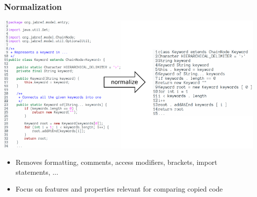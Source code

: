 \subsubsection{Normalization}
\begin{frame}{\insertsubsection}{\insertsubsubsection}
	\begin{center}
		\includegraphics[width=0.9\linewidth]{fig/normalization_1.pdf}
	\end{center}
	\begin{itemize}
		\small
		\item Removes formatting, comments, access modifiers, brackets, import statements, ...
		\item Focus on features and properties relevant for comparing copied code
	\end{itemize}

\end{frame}

